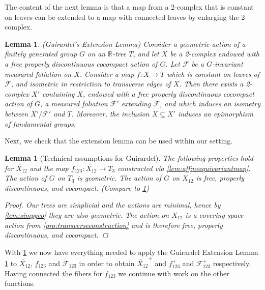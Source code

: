 \documentclass[12pt,parskip=full]{report}
\theoremstyle{plain}
\newtheorem{lem}[thm]{Lemma}
\theoremstyle{definition}
\begin{document}
        The content of the next lemma is that a map from a 2-complex that is constant on leaves can be extended to a map with connected leaves by enlarging the 2-complex.
        \begin{lem}
            \label{lem:guirardel-extension}
            (Guirardel's Extension Lemma)
            Consider a geometric action of a finitely generated group \(G\) on an \(\mathbb{R}\)-tree \(T\), and let \(X\) be a 2-complex endowed with a free properly discontinuous cocompact action of \(G\). Let \(\mathscr{F}\) be a \(G\)-invariant measured foliation on \(X\). Consider a map \(f: X \to T\) which is constant on leaves of \(\mathscr{F}\), and isometric in restriction to transverse edges of \(X\). Then there exists a 2-complex \( X'\) containing \(X\), endowed with a free properly discontinuous cocompact action of \(G\), a measured foliation \(\mathscr{F} '\) extending \(\mathscr{F}\), and which induces an isometry between \(X'/ \mathscr{F}'\) and \(T\). Moreover, the inclusion \(X \subseteq X'\) induces an epimorphism of fundamental groups.
        \end{lem}
        
        Next, we check that the extension lemma can be used within our setting.
\begin{lem}
[Technical assumptions for Guirardel]
    \label{lem:technicalconditions}
 The following properties hold for \(\widetilde{ X_{12} }\) and the map \(f_{123}: \widetilde{ X_{12}}\to T_3\) constructed via  \ref{lem:affineequivariantmap}. The action of \(G\) on \(T_3\) is geometric. The action of \(G\) on \(X_{12}\) is free, properly discontinuous, and cocompact. (Compare to \ref{lem:guirardel-extension})
    
    \begin{proof}
        Our trees are simplicial and the actions are minimal, hence by \ref{lem:simpgeo} they are also geometric. The action on \(X_{12}\) is a covering space action from \ref{pro:transverseconstruction} and is therefore free, properly discontinuous, and cocompact.
    \end{proof}
\end{lem}

        With \ref{lem:technicalconditions} we now have everything needed to apply the Guirardel Extension Lemma \ref{lem:guirardel-extension} to \(\widetilde{X_{12}}\), \(f_{123}\) and \(\mathscr{F}_{123}\) in order to obtain \(\widetilde{X_{12}}^{+}\) and \(f_{123}^{+}\) and \(\mathscr{F}_{123}^{+}\) respectively. Having connected the fibers for \(f_{123}\) we continue with  work on the other functions.
\end{document}
